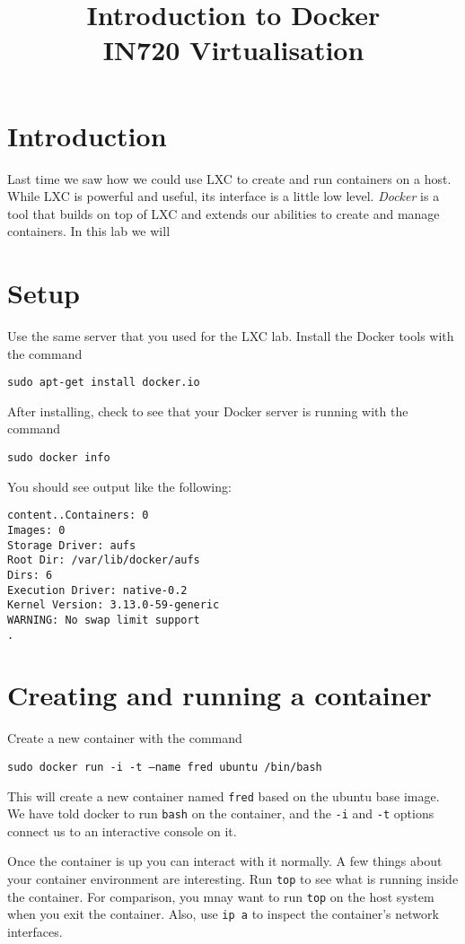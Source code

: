 \documentclass{article}
\begin{document}
\title{Introduction to Docker\\ IN720 Virtualisation}
\date{}
\maketitle

\section*{Introduction}
Last time we saw how we could use LXC to create and run containers on a host. While LXC is powerful and useful, its interface is a little low level. \emph{Docker} is a tool that builds on top of LXC and extends our abilities to create and manage containers.  In this lab we will 

\section{Setup}
Use the same server that you used for the LXC lab.  Install the Docker tools with the command

\texttt{sudo apt-get install docker.io}

After installing, check to see that your Docker server is running with the command 

\texttt{sudo docker info}

You should see output like the following:

\begin{verbatim}
content..Containers: 0
Images: 0
Storage Driver: aufs
Root Dir: /var/lib/docker/aufs
Dirs: 6
Execution Driver: native-0.2
Kernel Version: 3.13.0-59-generic
WARNING: No swap limit support
.
\end{verbatim}

\section{Creating and running a container}

Create a new container with the command

\texttt{sudo docker run -i -t --name fred ubuntu /bin/bash}

This will create a new container named \texttt{fred} based on the ubuntu base image. We have told docker to run \texttt{bash} on the container, and the \texttt{-i} and \texttt{-t} options connect us to an interactive console on it.  

Once the container is up you can interact with it normally.  A few things about your container environment are interesting. Run \texttt{top} to see what is running inside the container.  For comparison, you mnay want to run \texttt{top} on the host system when you exit the container.  Also, use \texttt{ip a} to inspect the container's network interfaces.
\end{document}
